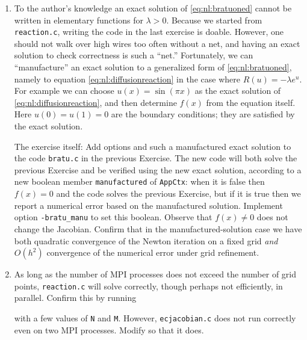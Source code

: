 \begin{enumerate}
\item To the author's knowledge an exact solution of \eqref{eq:nl:bratuoned} cannot be written in elementary functions for $\lambda>0$.  Because we started from \texttt{reaction.c}, writing the code in the last exercise is doable.  However, one should not walk over high wires too often without a net, and having an exact solution to check correctness is such a ``net.''  Fortunately, we can ``manufacture'' \citep{Wesseling2001} an exact solution to a generalized form of \eqref{eq:nl:bratuoned}, namely to equation \eqref{eq:nl:diffusionreaction} in the case where $R(u)=-\lambda e^u$.  For example we can choose $u(x) = \sin(\pi x)$ as the exact solution of \eqref{eq:nl:diffusionreaction}, and then determine $f(x)$ from the equation itself.  Here $u(0)=u(1)=0$ are the boundary conditions; they are satisfied by the exact solution.

The exercise itself: Add options and such a manufactured exact solution to the code \texttt{bratu.c} in the previous Exercise.  The new code will both solve the previous Exercise and be verified using the new exact solution, according to a new boolean member \texttt{manufactured} of \texttt{AppCtx}: when it is false then $f(x)=0$ and the code solves the previous Exercise, but if it is true then we report a numerical error based on the manufactured solution.  Implement option \texttt{-bratu\_manu} to set this boolean.  Observe that $f(x)\ne 0$ does not change the Jacobian.  Confirm that in the manufactured-solution case we have both quadratic convergence of the Newton iteration on a fixed grid \emph{and} $O(h^2)$ convergence of the numerical error under grid refinement.

\item As long as the number of MPI processes does not exceed the number of grid points, \texttt{reaction.c} will solve correctly, though perhaps not efficiently, in parallel.  Confirm this by running
with a few values of \texttt{N} and \texttt{M}.  However, \texttt{ecjacobian.c} does not run correctly even on two MPI processes.  Modify so that it does.


\end{enumerate}
